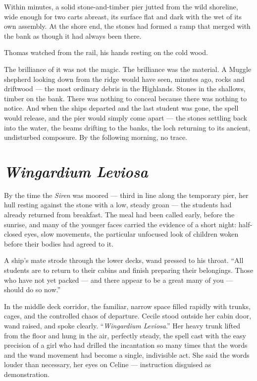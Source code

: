 Within minutes, a solid stone-and-timber pier jutted from the wild shoreline, wide enough for two carts abreast, its surface flat and dark with the wet of its own assembly. At the shore end, the stones had formed a ramp that merged with the bank as though it had always been there.

Thomas watched from the rail, his hands resting on the cold wood.

The brilliance of it was not the magic. The brilliance was the material. A Muggle shepherd looking down from the ridge would have seen, minutes ago, rocks and driftwood --- the most ordinary debris in the Highlands. Stones in the shallows, timber on the bank. There was nothing to conceal because there was nothing to notice. And when the ships departed and the last student was gone, the spell would release, and the pier would simply come apart --- the stones settling back into the water, the beams drifting to the banks, the loch returning to its ancient, undisturbed composure. By the following morning, no trace.

\section*{\textit{Wingardium Leviosa}}

By the time the \textit{Siren} was moored --- third in line along the temporary pier, her hull resting against the stone with a low, steady groan --- the students had already returned from breakfast. The meal had been called early, before the sunrise, and many of the younger faces carried the evidence of a short night: half-closed eyes, slow movements, the particular unfocused look of children woken before their bodies had agreed to it.

A ship's mate strode through the lower decks, wand pressed to his throat. \enquote{All students are to return to their cabins and finish preparing their belongings. Those who have not yet packed --- and there appear to be a great many of you --- should do so now.}

In the middle deck corridor, the familiar, narrow space filled rapidly with trunks, cages, and the controlled chaos of departure. Cecile stood outside her cabin door, wand raised, and spoke clearly. \enquote{\textit{Wingardium Leviosa}.} Her heavy trunk lifted from the floor and hung in the air, perfectly steady, the spell cast with the easy precision of a girl who had drilled the incantation so many times that the words and the wand movement had become a single, indivisible act. She said the words louder than necessary, her eyes on Celine --- instruction disguised as demonstration.

